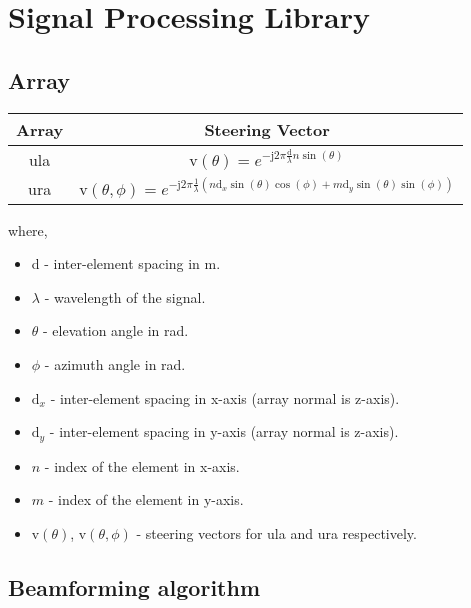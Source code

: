 \chapter{Signal Processing Library} \label{ch: signal-processing-library}

\section{Array}

\begin{center}
	\renewcommand{\arraystretch}{1.5}
	\begin{tabular}{|c|c|}
		\hline
		Array & Steering Vector  \\ \hline
		\acl{ula}   & $\text{v}(\theta) = e^{-\text{j}2\pi \frac{\text{d}}{\lambda} n\sin(\theta)}$          \\ \hline
		\acl{ura}   & $\text{v}(\theta, \phi) = e^{-\text{j}2\pi \frac{1}{\lambda}( n\text{d}_x\sin(\theta)\cos(\phi) + m\text{d}_y\sin(\theta)\sin(\phi))}$                 \\ \hline
	\end{tabular}
\end{center}


where,
\begin{itemize}
	\item d - inter-element spacing in m.
	\item $\lambda$ - wavelength of the signal.
	\item $\theta$ - elevation angle in rad.
	\item $\phi$ - azimuth angle in rad.
	\item $\text{d}_x$ - inter-element spacing in x-axis (array normal is z-axis).
	\item $\text{d}_y$ - inter-element spacing in y-axis (array normal is z-axis).
	\item $n$ - index of the element in x-axis.
	\item $m$ - index of the element in y-axis.
	\item $\text{v}(\theta)$, $\text{v}(\theta, \phi)$ - steering vectors for \ac{ula} and \ac{ura} respectively.
 \end{itemize}

\section{Beamforming algorithm}

